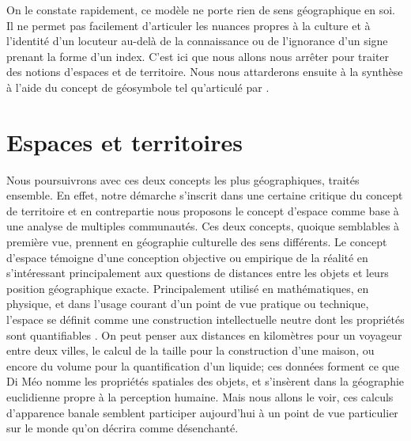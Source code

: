 On le constate rapidement, ce modèle ne porte  rien de sens géographique en soi.
Il ne permet pas facilement d'articuler les nuances propres à la culture et à l'identité d'un locuteur au-delà de la connaissance ou de l'ignorance d'un signe prenant la forme d'un index.
C'est ici que nous allons nous arrêter pour traiter des notions d'espaces et de territoire.
Nous nous attarderons ensuite à la synthèse à l'aide du concept de géosymbole tel qu'articulé par \citet{Bonnemaison1981}.

\section{Espaces et territoires}
\label{sec:espaces_et_territoires}

Nous poursuivrons avec ces deux concepts les plus géographiques, traités ensemble.
En effet, notre démarche s'inscrit dans une certaine critique du concept de territoire et en contrepartie nous proposons le concept d'espace comme base à une analyse de multiples communautés.
Ces deux concepts, quoique semblables à première vue, prennent en géographie culturelle des sens différents.
Le concept d'espace témoigne d'une conception objective ou empirique de la réalité en s'intéressant principalement aux questions de distances entre les objets et leurs position géographique exacte.
Principalement utilisé en mathématiques, en physique, et dans l'usage courant d'un point de vue pratique ou technique, l'espace se définit comme une construction intellectuelle neutre dont les propriétés sont quantifiables \citep[99]{DiMeo1998}.
On peut penser aux distances en kilomètres pour un voyageur entre deux villes, le calcul de la taille pour la construction d'une maison, ou encore du volume pour la quantification d'un liquide; ces données forment ce que Di Méo nomme les propriétés spatiales des objets, et s'insèrent dans la géographie euclidienne propre à la perception humaine.
Mais nous allons le voir, ces calculs d'apparence banale semblent participer aujourd'hui à un point de vue particulier sur le monde qu'on décrira comme désenchanté.

